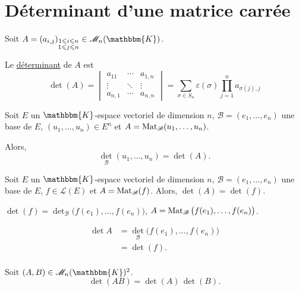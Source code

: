 \part{Déterminant d'une matrice carrée}

\begin{defn}
	Soit $A = (a_{i,j})_{\substack{1\le i\le n\\1\le j\le n}} \in \mathcal{M}_n(\mathbbm{K})$.

	Le \underline{déterminant} de $A$ est \[
		\det(A) =
		\begin{vmatrix}
			a_{11}&\cdots&a_{1,n}\\
			\vdots&\ddots&\vdots\\
			a_{n,1}&\cdots&a_{n,n}
		\end{vmatrix} = 
		\sum_{\sigma \in S_n} \varepsilon(\sigma) \prod_{j=1}^n a_{\sigma(j), j}
	\]

\end{defn}

\begin{prop}
	Soit $E$ un $\mathbbm{K}$-espace vectoriel de dimension $n$, $\mathcal{B} = (e_1, \ldots, e_n)$ une base de $E$, $(u_1, \ldots, u_n) \in E^n$ et $A = \operatorname{Mat}_\mathcal{B}(u_1, \ldots,u_n)$.

	Alors, \[
		\det_\mathcal{B}(u_1, \ldots, u_n) = \det(A).
	\]
\end{prop}

\begin{prop}
	Soit $E$ un $\mathbbm{K}$-espace vectoriel de dimension $n$, $\mathcal{B} = (e_1, \ldots, e_n)$ une base de $E$, $f \in \mathcal{L}(E)$ et $A = \operatorname{Mat}_\mathcal{B}(f)$. Alors, $\det(A) = \det(f)$.
\end{prop}

\begin{prv}
	$\det(f) = \det_\mathcal{B}\big(f(e_1), \ldots, f(e_n)\big)$, $A = \operatorname{Mat}_\mathcal{B}\big(f(e_1), \ldots, f(e_n) \big)$.

	\begin{align*}
		\det A &= \det_\mathcal{B}\big(f(e_1), \ldots, f(e_n)\big) \\
		&= \det(f). \\
	\end{align*}
\end{prv}

\begin{prop}
	Soit $(A,B) \in \mathcal{M}_n(\mathbbm{K})^2$. \[
		\det(AB) = \det(A)\,\det(B).
	\]
\end{prop}

